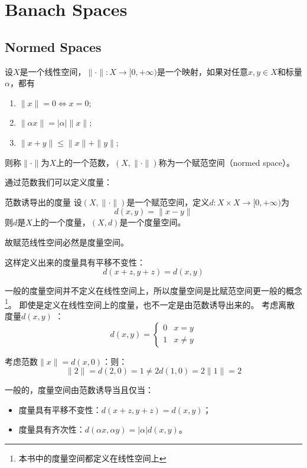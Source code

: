 \chapter{Banach Spaces}
\section{Normed Spaces}

\begin{definition}
    设$X$是一个线性空间，$\|\cdot\|:X\to [0,+\infty)$是一个映射，如果对任意$x,y\in X$和标量$\alpha$，都有
    \begin{enumerate}
        \item $\|x\|=0 \Leftrightarrow x=0$;
        \item $\|\alpha x\|=|\alpha|\|x\|$;
        \item $\|x+y\|\leq \|x\|+\|y\|$;
    \end{enumerate}
    则称$\|\cdot\|$为$X$上的一个范数，$(X,\|\cdot\|)$称为一个赋范空间（normed space）。
\end{definition}

通过范数我们可以定义度量：

\begin{definition}{范数诱导出的度量}
    设$(X,\|\cdot\|)$是一个赋范空间，定义$d:X\times X\to [0,+\infty)$为
    \[
        d(x,y)=\|x-y\|
    \]
    则$d$是$X$上的一个度量，$(X,d)$是一个度量空间。
\end{definition}

故赋范线性空间必然是度量空间。

这样定义出来的度量具有平移不变性：\[
    d(x+z,y+z)=d(x,y)
\]

一般的度量空间并不定义在线性空间上，所以度量空间是比赋范空间更一般的概念\footnote{本书中的度量空间都定义在线性空间上}。
即使是定义在线性空间上的度量，也不一定是由范数诱导出来的。
考虑离散度量\(d(x,y)\) ：
\[
    d(x,y)=
    \begin{cases}
        0 & x=y\\
        1 & x\neq y
    \end{cases}
\]

考虑范数\( \|x\| = d(x,0)\)：则：
\[
    \|2\| = d(2,0) = 1 \neq 2 d(1,0) = 2 \|1\|=2
\]

一般的，度量空间由范数诱导当且仅当：
\begin{itemize}
    \item 度量具有平移不变性：\(d(x+z,y+z)=d(x,y)\)；
    \item 度量具有齐次性：\(d(\alpha x, \alpha y) = |\alpha| d(x,y)\)。
\end{itemize}

